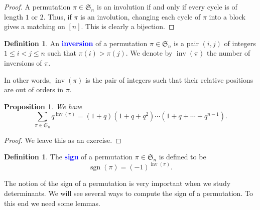 \documentclass[oneside]{book}
\numberwithin{equation}{section}
\newtheorem{prop}[thm]{Proposition}
\theoremstyle{definition}
\newtheorem{defn}[thm]{Definition}
\newcommand\inv{\operatorname{inv}}
\newcommand\sgn{\operatorname{sgn}}
\newcommand\sym{\mathfrak{S}}
\renewcommand\emph[1]{\textcolor{blue}{\bf #1}}
\begin{document}
\begin{proof}
  A permutation \( \pi\in \sym_n \) is an involution if and only if
  every cycle is of length \( 1 \) or \( 2 \). Thus, if \( \pi \) is
  an involution, changing each cycle of \( \pi \) into a block gives a
  matching on \( [n] \). This is clearly a bijection.
\end{proof}



\begin{defn}
  An \emph{inversion} of a permutation \( \pi\in \sym_n \) is a pair
  \( (i,j) \) of integers \( 1\le i<j\le n \) such that
  \( \pi(i) > \pi(j) \). We denote by \( \inv(\pi) \) the number of
  inversions of \( \pi \).
\end{defn}

In other words, \( \inv(\pi) \) is the pair of integers such that
their relative positions are out of orders in \( \pi \).

\begin{prop}
  We have
  \[
    \sum_{\pi\in \sym_n} q^{\inv(\pi)}
    = (1+q) (1+q+q^2) \cdots (1+q + \cdots + q^{n-1}).
  \]
\end{prop}
\begin{proof}
We leave this as an exercise.
\end{proof}


\begin{defn}
  The \emph{sign} of a permutation \( \pi\in \sym_n \) is
  defined to be
  \[
    \sgn(\pi) = (-1)^{\inv(\pi)}.
  \]
\end{defn}

The notion of the sign of a permutation is very important when we
study determinants. We will see several ways to compute the sign of a
permutation. To this end we need some lemmas.
\end{document}
